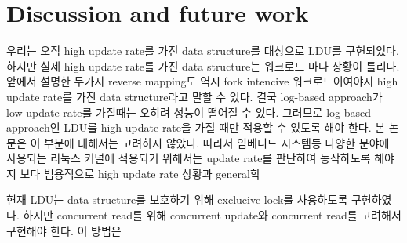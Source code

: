 \section{Discussion and future work}

우리는 오직 high update rate를 가진 data structure를 대상으로 LDU를 구현되었다. 
하지만 실제 high update rate를 가진 data structure는 워크로드 마다 상황이 틀리다.
앞에서 설명한 두가지 reverse mapping도 역시 fork intencive 워크로드이여야지 high update rate를 가진
data structure라고 말할 수 있다. 
결국 log-based approach가 low update rate를 가질때는 오히려 성능이 떨어질 수 있다.
그러므로 log-based approach인 LDU를 high update rate을 가질 때만 적용할 수 있도록 해야 한다.
본 논문은 이 부분에 대해서는 고려하지 않았다.
따라서 임베디드 시스템등 다양한 분야에 사용되는 리눅스 커널에 적용되기 위해서는 update rate를 판단하여 동작하도록 해야지 보다
범용적으로 high update rate 상황과 general학


현재 LDU는 data structure를 보호하기 위해 exclucive lock를 사용하도록 구현하였다. 
하지만 concurrent read를 위해 concurrent update와 concurrent read를 고려해서 구현해야 한다.
이 방법은 











